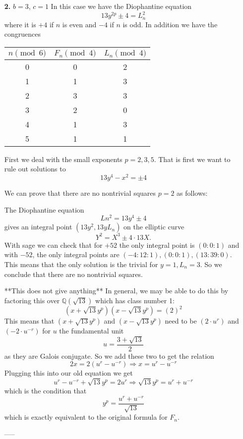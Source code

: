 \documentclass[12pt]{article}
\def\Q{{\mathbb Q}}
\begin{document}
 \begin{enumerate}
 
\item[\textbf{2.}] $b = 3$, $c = 1$
In this case we have the Diophantine equation
\[13y^{2p}  \pm 4 = L_n^2\]
where it is $+4$ if $n$ is even and $-4$ if $n$ is odd.  
In addition we have the congruences
\begin{center}
\begin{tabular}{c| c c}
$n \pmod{6}$ & $F_n \pmod{4}$ & $L_n \pmod{4}$ \\ \hline \hline
0 & 0 & 2 \\
1 & 1 &  3 \\
2 & 3 & 3 \\
3 & 2 & 0 \\
4 & 1 & 3 \\
5 & 1 & 1  \\ \hline \hline
\end{tabular}
\end{center}

First we deal with the small exponents $p = 2,3,5$.  That is first we want to rule out solutions to
\[ 13y^{4} -x^{2} = \pm 4 \]


We can prove that there are no nontrivial squares $p=2$ as follows:

The Diophantine equation
\[ Ln^2 = 13y^4 \pm 4\]
gives an integral point $(13y^2, 13yL_n)$ on the elliptic curve
\[ Y^2 = X^3 \pm 4 \cdot 13 X .\]
With sage we can check that for $+52$ the only integral point is $(0:0:1)$ and with $-52$, the only integral points are $(-4:12:1), (0:0:1), (13:39:0)$.  This means that the only solution is the trivial for $y = 1, L_n = 3$.   So we conclude that there are no nontrivial squares.


**This does not give anything** In general, we may be able to do this by factoring this over $\Q(\sqrt{13})$ which has class number 1:
\[ (x + \sqrt{13} y^p)(x - \sqrt{13}y^p) = (2)^2 \]
This means that $(x+\sqrt{13}y^p)$ and $(x-\sqrt{13}y^p)$ need to be $(2 \cdot u^r)$ and $(-2 \cdot u^{-r})$ for $u$ the fundamental unit 
\[ u = \frac{3 + \sqrt{13}}{2} \]
as they are Galois conjugate.  So we add these two to get the relation
\[2x = 2(u^r-u^{-r}) \Rightarrow x = u^r-u^{-r} \]
Plugging this into our old equation we get
\[u^r - u^{-r} + \sqrt{13}y^p = 2u^r  \Rightarrow \sqrt{13}y^p = u^r + u^{-r}\]
which is the condition that
\[ y^p = \frac{u^r + u^{-r}}{\sqrt{13}} \]
which is exactly equivalent to the original formula for $F_n$.

-----



\end{enumerate}
\end{document}
